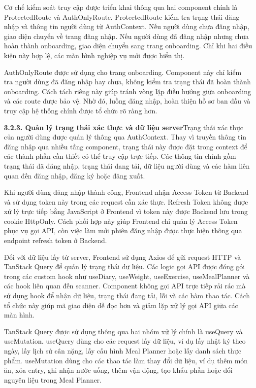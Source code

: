 Cơ chế kiểm soát truy cập được triển khai thông qua hai component chính là ProtectedRoute và AuthOnlyRoute. ProtectedRoute kiểm tra trạng thái đăng nhập và thông tin người dùng từ AuthContext. Nếu người dùng chưa đăng nhập, giao diện chuyển về trang đăng nhập. Nếu người dùng đã đăng nhập nhưng chưa hoàn thành onboarding, giao diện chuyển sang trang onboarding. Chỉ khi hai điều kiện này hợp lệ, các màn hình nghiệp vụ mới được hiển thị.

AuthOnlyRoute được sử dụng cho trang onboarding. Component này chỉ kiểm tra người dùng đã đăng nhập hay chưa, không kiểm tra trạng thái đã hoàn thành onboarding. Cách tách riêng này giúp tránh vòng lặp điều hướng giữa onboarding và các route được bảo vệ. Nhờ đó, luồng đăng nhập, hoàn thiện hồ sơ ban đầu và truy cập hệ thống chính được tổ chức rõ ràng hơn.

\textbf{3.2.3. Quản lý trạng thái xác thực và dữ liệu server}Trạng thái xác thực của người dùng được quản lý thông qua AuthContext. Thay vì truyền thông tin đăng nhập qua nhiều tầng component, trạng thái này được đặt trong context để các thành phần cần thiết có thể truy cập trực tiếp. Các thông tin chính gồm trạng thái đã đăng nhập, trạng thái đang tải, dữ liệu người dùng và các hàm liên quan đến đăng nhập, đăng ký hoặc đăng xuất.

Khi người dùng đăng nhập thành công, Frontend nhận Access Token từ Backend và sử dụng token này trong các request cần xác thực. Refresh Token không được xử lý trực tiếp bằng JavaScript ở Frontend vì token này được Backend lưu trong cookie HttpOnly. Cách phối hợp này giúp Frontend chỉ quản lý Access Token phục vụ gọi API, còn việc làm mới phiên đăng nhập được thực hiện thông qua endpoint refresh token ở Backend.

Đối với dữ liệu lấy từ server, Frontend sử dụng Axios để gửi request HTTP và TanStack Query để quản lý trạng thái dữ liệu. Các logic gọi API được đóng gói trong các custom hook như useDiary, useWeight, useExercise, useMealPlanner và các hook liên quan đến scanner. Component không gọi API trực tiếp rải rác mà sử dụng hook để nhận dữ liệu, trạng thái đang tải, lỗi và các hàm thao tác. Cách tổ chức này giúp mã giao diện dễ đọc hơn và giảm lặp xử lý gọi API giữa các màn hình.

TanStack Query được sử dụng thông qua hai nhóm xử lý chính là useQuery và useMutation. useQuery dùng cho các request lấy dữ liệu, ví dụ lấy nhật ký theo ngày, lấy lịch sử cân nặng, lấy cấu hình Meal Planner hoặc lấy danh sách thực phẩm. useMutation dùng cho các thao tác làm thay đổi dữ liệu, ví dụ thêm món ăn, xóa entry, ghi nhận nước uống, thêm vận động, tạo khẩu phần hoặc đổi nguyên liệu trong Meal Planner.

